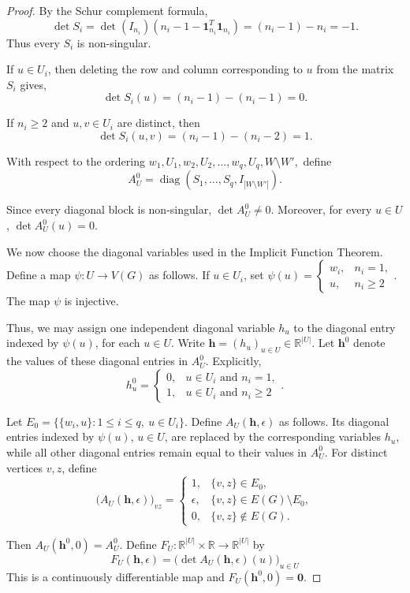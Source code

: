 \documentclass[10pt,a4paper]{amsart}
\begin{document}
\begin{proof}
By the Schur complement formula,
\[
\det S_i
=
\det(I_{n_i})
\left(
n_i-1-\mathbf 1_{n_i}^{T}\mathbf 1_{n_i}
\right)
=(n_i-1)-n_i
=-1.
\]
Thus every \(S_i\) is non-singular.

If \(u\in U_i\), then deleting the row and column corresponding to 
\(u\) from the matrix \(S_i\) gives,
\[
\det S_i(u)
=
(n_i-1)-(n_i-1)
=0.
\]

If \(n_i\geq2\) and \(u,v\in U_i\) are distinct, then
\[
\det S_i(u,v)
=
(n_i-1)-(n_i-2)
=1.
\]

With respect to the ordering
\(
w_1,U_1,w_2,U_2,\ldots,w_q,U_q,W\setminus W',
\)
define
\[
A_U^0
=
\operatorname{diag}
\left(
S_1,\ldots,S_q,I_{|W\setminus W'|}
\right).
\]

Since every diagonal block is non-singular,
\(
\det A_U^0\neq0.
\)
Moreover, for every \(u\in U\),
\(
\det A_U^0(u)=0.
\)

We now choose the diagonal variables used in the Implicit Function
Theorem. Define a map
\(
\psi:U\longrightarrow V(G)
\)
as follows. If \(u\in U_i\), set
\(
\psi(u)=
\begin{cases}
w_i, & n_i=1,\\
u,   & n_i\geq2
\end{cases}
\).
The map \(\psi\) is injective. 

Thus, we may assign one independent
diagonal variable \(h_u\) to the diagonal entry indexed by
\(\psi(u)\), for each \(u\in U\). Write
\(
\mathbf h=(h_u)_{u\in U}\in\mathbb R^{|U|}.
\)
Let \(\mathbf h^0\) denote the values of these diagonal entries in
\(A_U^0\). Explicitly,
\[
h_u^0=
\begin{cases}
0, & u\in U_i\text{ and }n_i=1,\\
1, & u\in U_i\text{ and }n_i\geq2
\end{cases}.
\]

Let
\(
E_0=\bigl\{\{w_i,u\}:1\leq i\leq q,\ u\in U_i\bigr\}.
\)
Define \(A_U(\mathbf h,\epsilon)\) as follows. Its diagonal entries
indexed by \(\psi(u)\), \(u\in U\), are replaced by the corresponding
variables \(h_u\), while all other diagonal entries remain equal to
their values in \(A_U^0\). For distinct vertices \(v,z\), define
\[
\bigl(A_U(\mathbf h,\epsilon)\bigr)_{vz}
=
\begin{cases}
1,
& \{v,z\}\in E_0,\\
\epsilon,
& \{v,z\}\in E(G)\setminus E_0,\\
0,
& \{v,z\}\notin E(G).
\end{cases}
\]

Then
\(
A_U(\mathbf h^0,0)=A_U^0.
\)
Define
\(
F_U:\mathbb R^{|U|}\times\mathbb R
\longrightarrow
\mathbb R^{|U|}
\)
by
\[
F_U(\mathbf h,\epsilon)
=
\bigl(
\det A_U(\mathbf h,\epsilon)(u)
\bigr)_{u\in U}
\]
This is a continuously differentiable map and
\(
F_U(\mathbf h^0,0)=\mathbf 0.
\)


\end{proof}
\end{document}
